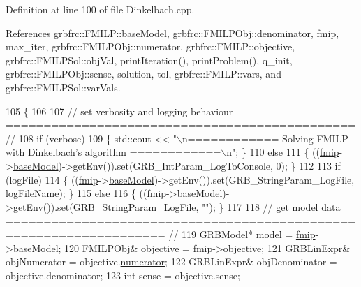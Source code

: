 Definition at line 100 of file Dinkelbach.\+cpp.



References grbfrc\+::\+F\+M\+I\+L\+P\+::base\+Model, grbfrc\+::\+F\+M\+I\+L\+P\+Obj\+::denominator, fmip, max\+\_\+iter, grbfrc\+::\+F\+M\+I\+L\+P\+Obj\+::numerator, grbfrc\+::\+F\+M\+I\+L\+P\+::objective, grbfrc\+::\+F\+M\+I\+L\+P\+Sol\+::obj\+Val, print\+Iteration(), print\+Problem(), q\+\_\+init, grbfrc\+::\+F\+M\+I\+L\+P\+Obj\+::sense, solution, tol, grbfrc\+::\+F\+M\+I\+L\+P\+::vars, and grbfrc\+::\+F\+M\+I\+L\+P\+Sol\+::var\+Vals.


\begin{DoxyCode}
105  \{
106 
107   \textcolor{comment}{// set verbosity and logging behaviour ============================================== //}
108   \textcolor{keywordflow}{if} (verbose)
109    \{ std::cout << \textcolor{stringliteral}{"\(\backslash\)n============ Solving FMILP with Dinkelbach's algorithm ============\(\backslash\)n"}; \}
110   \textcolor{keywordflow}{else}
111    \{ ((\hyperlink{classgrbfrc_1_1Dinkelbach_aa7b46a3cb24f1ec0f278edaa2348729d}{fmip}->\hyperlink{classgrbfrc_1_1FMILP_a587e886dcaa1ece325a7f283100182a8}{baseModel})->getEnv()).\textcolor{keyword}{set}(GRB\_IntParam\_LogToConsole, 0); \}
112 
113   \textcolor{keywordflow}{if} (logFile)
114    \{ ((\hyperlink{classgrbfrc_1_1Dinkelbach_aa7b46a3cb24f1ec0f278edaa2348729d}{fmip}->\hyperlink{classgrbfrc_1_1FMILP_a587e886dcaa1ece325a7f283100182a8}{baseModel})->getEnv()).\textcolor{keyword}{set}(GRB\_StringParam\_LogFile, logFileName); \}
115   \textcolor{keywordflow}{else}
116    \{ ((\hyperlink{classgrbfrc_1_1Dinkelbach_aa7b46a3cb24f1ec0f278edaa2348729d}{fmip}->\hyperlink{classgrbfrc_1_1FMILP_a587e886dcaa1ece325a7f283100182a8}{baseModel})->getEnv()).\textcolor{keyword}{set}(GRB\_StringParam\_LogFile, \textcolor{stringliteral}{""}); \}
117 
118   \textcolor{comment}{// get model data =================================================================== //}
119   GRBModel* model = \hyperlink{classgrbfrc_1_1Dinkelbach_aa7b46a3cb24f1ec0f278edaa2348729d}{fmip}->\hyperlink{classgrbfrc_1_1FMILP_a587e886dcaa1ece325a7f283100182a8}{baseModel};
120   FMILPObj& objective = \hyperlink{classgrbfrc_1_1Dinkelbach_aa7b46a3cb24f1ec0f278edaa2348729d}{fmip}->\hyperlink{classgrbfrc_1_1FMILP_a8807cc16614684fd6053b44dcd65657c}{objective};
121   GRBLinExpr& objNumerator = objective.\hyperlink{structgrbfrc_1_1FMILPObj_a01c26f8e99a6692909e562aa561c9274}{numerator};
122   GRBLinExpr& objDenominator = objective.denominator;
123   \textcolor{keywordtype}{int} sense = objective.sense;

\end{DoxyCode}

